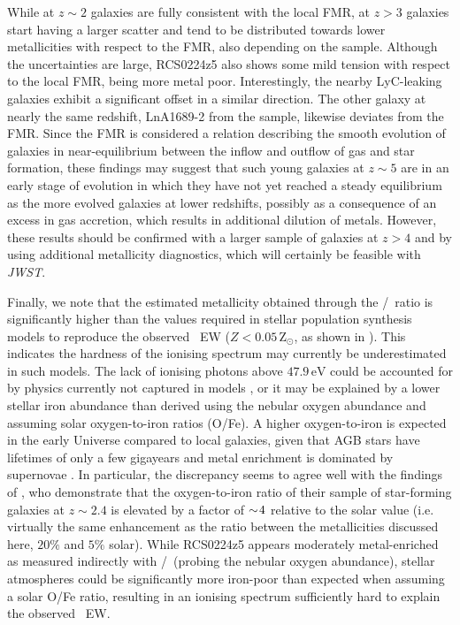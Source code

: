 While at $z \sim 2$ galaxies are fully consistent with the local FMR, at $z > 3$ galaxies start having a larger scatter and tend to be distributed towards lower metallicities with respect to the FMR, also depending on the sample. Although the uncertainties are large, RCS0224z5 also shows some mild tension with respect to the local FMR, being more metal poor. Interestingly, the nearby LyC-leaking galaxies exhibit a significant offset in a similar direction. The other galaxy at nearly the same redshift, LnA1689-2 from the \citeauthor{2014A&A...563A..58T} sample, likewise deviates from the FMR. Since the FMR is considered a relation describing the smooth evolution of galaxies in near-equilibrium between the inflow and outflow of gas and star formation, these findings may suggest that such young galaxies at $z \sim 5$ are in an early stage of evolution in which they have not yet reached a steady equilibrium as the more evolved galaxies at lower redshifts, possibly as a consequence of an excess in gas accretion, which results in additional dilution of metals. However, these results should be confirmed with a larger sample of galaxies at $z > 4$ and by using additional metallicity diagnostics, which will certainly be feasible with \textit{JWST}.

Finally, we note that the estimated metallicity obtained through the \NeIII/\OII\ ratio is significantly higher than the values required in stellar population synthesis models to reproduce the observed \CIV\ EW ($Z < 0.05 \, \mathrm{Z_\odot}$, as shown in \citealt{2017MNRAS.467.3306S}). This indicates the hardness of the ionising spectrum may currently be underestimated in such models. The lack of ionising photons above $47.9 \, \mathrm{eV}$ could be accounted for by physics currently not captured in models \citep[e.g. stars stripped in binaries,][]{2019A&A...629A.134G}, or it may be explained by a lower stellar iron abundance than derived using the nebular oxygen abundance and assuming solar oxygen-to-iron ratios (O/Fe). A higher oxygen-to-iron is expected in the early Universe compared to local galaxies, given that AGB stars have lifetimes of only a few gigayears and metal enrichment is dominated by supernovae \citep{2019A&ARv..27....3M}. In particular, the discrepancy seems to agree well with the findings of \citet{2016ApJ...826..159S}, who demonstrate that the oxygen-to-iron ratio of their sample of star-forming galaxies at $z \sim 2.4$ is elevated by a factor of $\sim \! 4$ relative to the solar value (i.e. virtually the same enhancement as the ratio between the metallicities discussed here, $20\%$ and $5\%$ solar). While RCS0224z5 appears moderately metal-enriched as measured indirectly with \NeIII/\OII\ (probing the nebular oxygen abundance), stellar atmospheres could be significantly more iron-poor than expected when assuming a solar O/Fe ratio, resulting in an ionising spectrum sufficiently hard to explain the observed \CIV\ EW.

